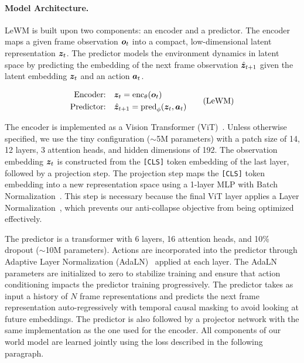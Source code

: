 \paragraph{Model Architecture.} LeWM is built upon two components: an encoder and a predictor. The encoder maps a given frame observation ${\bm{o}}_t$ into a compact, low-dimensional latent representation ${\bm{z}}_t$. 
The predictor models the environment dynamics in latent space by predicting the embedding of the next frame observation $\hat{{\bm{z}}}_{t+1}$ given the latent embedding ${\bm{z}}_t$ and an action ${\bm{a}}_t$.

\begin{equation}
\begin{aligned}
\text{Encoder:} \quad & {\bm{z}}_t = {\rm enc}_\theta({\bm{o}}_t) \\
\text{Predictor:} \quad & \hat{{\bm{z}}}_{t+1} = {\rm pred}_\phi({\bm{z}}_t, {\bm{a}}_t)
\end{aligned}
\tag{LeWM}
\end{equation}

The encoder is implemented as a Vision Transformer (ViT)~\cite{dosovitskiy2020image}. Unless otherwise specified, we use the tiny configuration ($\sim$5M parameters) with a patch size of 14, 12 layers, 3 attention heads, and hidden dimensions of 192. The observation embedding ${\bm{z}}_t$ is constructed from the \texttt{[CLS]} token embedding of the last layer, followed by a projection step. The projection step maps the \texttt{[CLS]} token embedding into a new representation space using a 1-layer MLP with Batch Normalization~\cite{ioffe2015batchnormalizationacceleratingdeep}. This step is necessary because the final ViT layer applies a Layer Normalization~\cite{ba2016layer}, which prevents our anti-collapse objective from being optimized effectively. 

The predictor is a transformer with 6 layers, 16 attention heads, and 10\% dropout ($\sim$10M parameters). Actions are incorporated into the predictor through Adaptive Layer Normalization (AdaLN)~\cite{peebles2023scalable} applied at each layer. The AdaLN parameters are initialized to zero to stabilize training and ensure that action conditioning impacts the predictor training progressively. The predictor takes as input a history of $N$ frame representations and predicts the next frame representation auto-regressively with temporal causal masking to avoid looking at future embeddings. The predictor is also followed by a projector network with the same implementation as the one used for the encoder.
All components of our world model are learned jointly using the loss described in the following paragraph.

